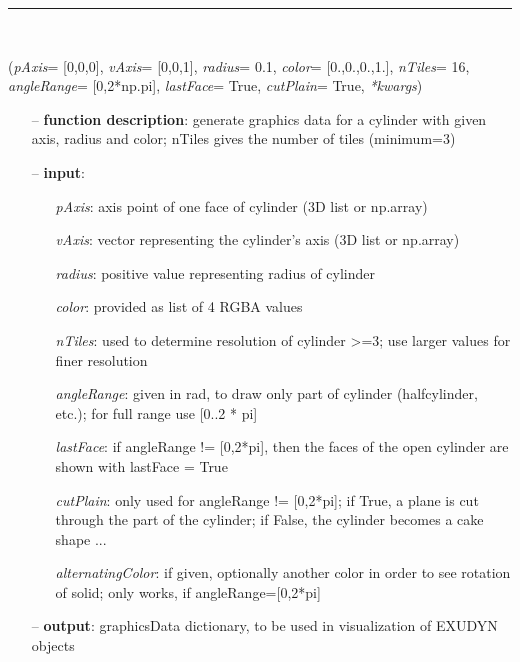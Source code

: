 \begin{itemize}[leftmargin=1.4cm]
\begin{itemize}[leftmargin=0.5cm]
\begin{itemize}[leftmargin=1.4cm]
\begin{itemize}[leftmargin=1.4cm]
\begin{itemize}[leftmargin=0.5cm]
\begin{itemize}[leftmargin=1.4cm]
\begin{itemize}[leftmargin=0.5cm]
%
\noindent\rule{8cm}{0.75pt}\vspace{1pt} \\ 
\begin{flushleft}
\label{sec:graphicsDataUtilities:GraphicsDataCylinder}
({\it pAxis}= [0,0,0], {\it vAxis}= [0,0,1], {\it radius}= 0.1, {\it color}= [0.,0.,0.,1.], {\it nTiles}= 16, {\it angleRange}= [0,2*np.pi], {\it lastFace}= True, {\it cutPlain}= True, {\it **kwargs})
\end{flushleft}
\setlength{\itemindent}{0.7cm}
\begin{itemize}[leftmargin=0.7cm]
  \item[--]  {\bf function description}: generate graphics data for a cylinder with given axis, radius and color; nTiles gives the number of tiles (minimum=3)  \item[--]  {\bf input}: \vspace{-6pt}
  \begin{itemize}[leftmargin=1.2cm]
\setlength{\itemindent}{-0.7cm}
    \item[] {\it pAxis}: axis point of one face of cylinder (3D list or np.array)
    \item[] {\it   vAxis}: vector representing the cylinder's axis (3D list or np.array)
    \item[] {\it   radius}: positive value representing radius of cylinder
    \item[] {\it   color}: provided as list of 4 RGBA values
    \item[] {\it   nTiles}: used to determine resolution of cylinder >=3; use larger values for finer resolution
    \item[] {\it   angleRange}: given in rad, to draw only part of cylinder (halfcylinder, etc.); for full range use [0..2 * pi]
    \item[] {\it   lastFace}: if angleRange != [0,2*pi], then the faces of the open cylinder are shown with lastFace = True
    \item[] {\it   cutPlain}: only used for angleRange != [0,2*pi]; if True, a plane is cut through the part of the cylinder; if False, the cylinder becomes a cake shape ...
    \item[] {\it   alternatingColor}: if given, optionally another color in order to see rotation of solid; only works, if angleRange=[0,2*pi]
  \end{itemize}
  \item[--]  {\bf output}: graphicsData dictionary, to be used in visualization of EXUDYN objects\vspace{12pt}\end{itemize}

\end{itemize}
\end{itemize}
\end{itemize}
\end{itemize}
\end{itemize}
\end{itemize}
\end{itemize}
